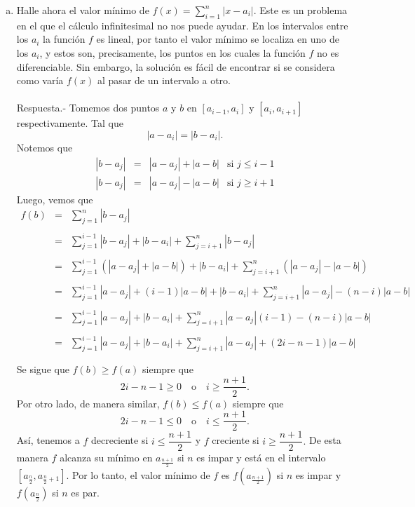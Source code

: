 \begin{enumerate}[\bfseries 1.]
\begin{enumerate}[(a)]
	    \item Halle ahora el valor mínimo de $f(x)=\sum\limits_{i=1}^n |x-a_i|$. Este es un problema en el que el cálculo infinitesimal no nos puede ayudar. En los intervalos entre los $a_i$ la función $f$ es lineal, por tanto el valor mínimo se localiza en uno de los $a_i$, y estos son, precisamente, los puntos en los cuales la función $f$ no es diferenciable. Sin embargo, la solución es fácil de encontrar si se considera como varía $f(x)$ al pasar de un intervalo a otro.\\\\
		Respuesta.-\; Tomemos dos puntos $a$ y $b$ en $[a_{i-1},a_i]$ y $[a_i,a_{i+1}]$ respectivamente. Tal que 
		$$|a-a_i|=|b-a_i|.$$
		Notemos que
		$$\begin{array}{rclr}
		    |b-a_j| &=& |a-a_j|+|a-b| & \mbox{si } j\leq i-1\\
		    |b-a_j| &=& |a-a_j|-|a-b| & \mbox{si } j\geq i+1
		\end{array}$$
		Luego, vemos que
		$$\begin{array}{rcl}
		    f(b) &=& \displaystyle \sum_{j=1}^n |b-a_j|\\\\
			 &=& \displaystyle \sum_{j=1}^{i-1} |b-a_j|+|b-a_i|+\sum_{j=i+1}^n|b-a_j|\\\\
			 &=& \displaystyle \sum_{j=1}^{i-1} \left(|a-a_j|+|a-b|\right)+|b-a_i|+\sum_{j=i+1}^n\left(|a-a_j|-|a-b|\right)\\\\
			 &=& \displaystyle \sum_{j=1}^{i-1} |a-a_j|+(i-1)|a-b|+|b-a_i|+\sum_{j=i+1}^n|a-a_j|-(n-i)|a-b|\\\\
			 &=& \displaystyle \sum_{j=1}^{i-1} |a-a_j|+|b-a_i|+\sum_{j=i+1}^n|a-a_j|(i-1)-(n-i)|a-b|\\\\
			 &=& \displaystyle \sum_{j=1}^{i-1} |a-a_j|+|b-a_i|+\sum_{j=i+1}^n|a-a_j|+(2i-n-1)|a-b|\\\\
		\end{array}$$
		Se sigue que $f(b)\geq f(a)$ siempre que
		$$2i-n-1\geq 0 \quad \mbox{o}\quad i\geq \dfrac{n+1}{2}.$$
		Por otro lado, de manera similar, $f(b)\leq f(a)$ siempre que
		$$2i-n-1\leq 0 \quad \mbox{o}\quad i\leq \dfrac{n+1}{2}.$$
		Así, tenemos a $f$ decreciente si $i\leq \dfrac{n+1}{2}$ y $f$ creciente si $i\geq \dfrac{n+1}{2}.$ De esta manera $f$ alcanza su mínimo en $a_{\frac{n+1}{2}}$ si $n$ es impar y está en el intervalo $\left[a_{\frac{n}{2}},a_{\frac{n}{2}+1}\right]$. Por lo tanto, el valor mínimo de $f$ es $f\left(a_{\frac{n+1}{2}}\right)$ si $n$ es impar y $f\left(a_{\frac{n}{2}}\right)$ si $n$ es par.\\\\


\end{enumerate}
\end{enumerate}
